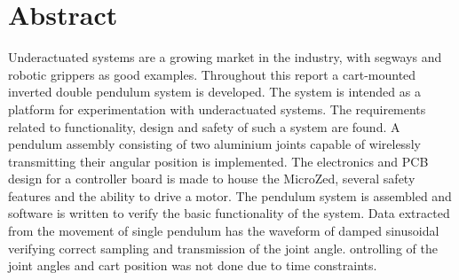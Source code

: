 \section*{Abstract}
Underactuated systems are a growing market in the industry, with segways and robotic grippers as good examples.
Throughout this report a cart-mounted inverted double pendulum system is developed.
The system is intended as a platform for experimentation with underactuated systems.
The requirements related to functionality, design and safety of such a system are found.
A pendulum assembly consisting of two aluminium joints capable of wirelessly transmitting their angular position is implemented.
The electronics and PCB design for a controller board is made to house the MicroZed, several safety features and the ability to drive a motor.
The pendulum system is assembled and software is written to verify the basic functionality of the system.
Data extracted from the movement of single pendulum has the waveform of damped sinusoidal verifying correct sampling and transmission of the joint angle.
ontrolling of the joint angles and cart position was not done due to time constraints.